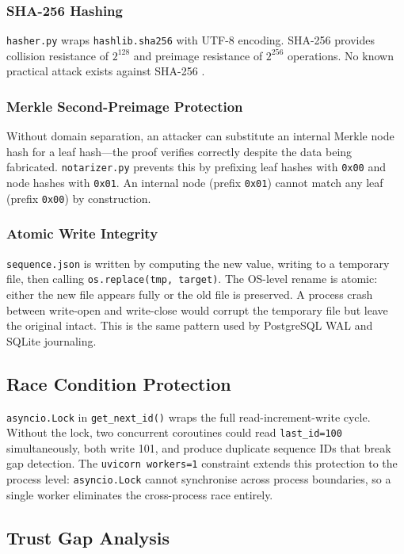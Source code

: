 \documentclass[12pt,a4paper]{article}
\begin{document}
\subsubsection{SHA-256 Hashing}
\texttt{hasher.py} wraps \texttt{hashlib.sha256} with UTF-8 encoding.
SHA-256 provides collision resistance of $2^{128}$ and preimage resistance
of $2^{256}$ operations. No known practical attack exists against SHA-256
\cite{nist2001}.

\subsubsection{Merkle Second-Preimage Protection}
Without domain separation, an attacker can substitute an internal
Merkle node hash for a leaf hash---the proof verifies correctly despite
the data being fabricated. \texttt{notarizer.py} prevents this by
prefixing leaf hashes with \texttt{0x00} and node hashes with
\texttt{0x01}. An internal node (prefix \texttt{0x01}) cannot match
any leaf (prefix \texttt{0x00}) by construction.

\subsubsection{Atomic Write Integrity}
\texttt{sequence.json} is written by computing the new value, writing
to a temporary file, then calling \texttt{os.replace(tmp, target)}.
The OS-level rename is atomic: either the new file appears fully or
the old file is preserved. A process crash between write-open and
write-close would corrupt the temporary file but leave the original
intact. This is the same pattern used by PostgreSQL WAL and SQLite
journaling.

\subsection{Race Condition Protection}
\label{sec:race}

\texttt{asyncio.Lock} in \texttt{get\_next\_id()} wraps the full
read-increment-write cycle. Without the lock, two concurrent coroutines
could read \texttt{last\_id=100} simultaneously, both write 101, and
produce duplicate sequence IDs that break gap detection. The
\texttt{uvicorn workers=1} constraint extends this protection to the
process level: \texttt{asyncio.Lock} cannot synchronise across process
boundaries, so a single worker eliminates the cross-process race entirely.

\subsection{Trust Gap Analysis}
\label{sec:trust-gap}
\end{document}
